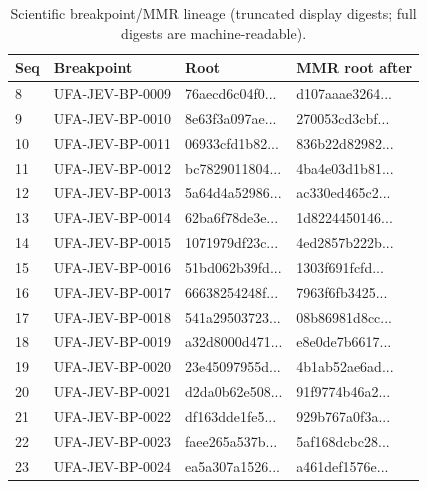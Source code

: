 \begin{table}[t]
\centering
\small
\begin{tabular}{llll}
\toprule
Seq & Breakpoint & Root & MMR root after \\
\midrule
8 & UFA-JEV-BP-0009 & 76aecd6c04f0... & d107aaae3264... \\
9 & UFA-JEV-BP-0010 & 8e63f3a097ae... & 270053cd3cbf... \\
10 & UFA-JEV-BP-0011 & 06933cfd1b82... & 836b22d82982... \\
11 & UFA-JEV-BP-0012 & bc7829011804... & 4ba4e03d1b81... \\
12 & UFA-JEV-BP-0013 & 5a64d4a52986... & ac330ed465c2... \\
13 & UFA-JEV-BP-0014 & 62ba6f78de3e... & 1d8224450146... \\
14 & UFA-JEV-BP-0015 & 1071979df23c... & 4ed2857b222b... \\
15 & UFA-JEV-BP-0016 & 51bd062b39fd... & 1303f691fcfd... \\
16 & UFA-JEV-BP-0017 & 66638254248f... & 7963f6fb3425... \\
17 & UFA-JEV-BP-0018 & 541a29503723... & 08b86981d8cc... \\
18 & UFA-JEV-BP-0019 & a32d8000d471... & e8e0de7b6617... \\
19 & UFA-JEV-BP-0020 & 23e45097955d... & 4b1ab52ae6ad... \\
20 & UFA-JEV-BP-0021 & d2da0b62e508... & 91f9774b46a2... \\
21 & UFA-JEV-BP-0022 & df163dde1fe5... & 929b767a0f3a... \\
22 & UFA-JEV-BP-0023 & faee265a537b... & 5af168dcbc28... \\
23 & UFA-JEV-BP-0024 & ea5a307a1526... & a461def1576e... \\
\bottomrule
\end{tabular}
\caption{Scientific breakpoint/MMR lineage (truncated display digests; full digests are machine-readable).}
\label{tab:breakpoints}
\end{table}
